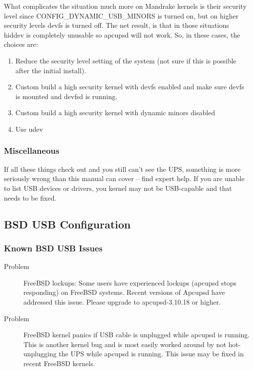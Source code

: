 What complicates the situation much more on Mandrake kernels is their security
level since CONFIG\_DYNAMIC\_USB\_MINORS is turned on, but on higher security
levels devfs is turned off. The net result, is that in those situations hiddev
is completely unusable so apcupsd will not work. So, in these cases,
the choices are: 

\begin{enumerate}
    \item Reduce the security level setting of the system (not sure if 
    this is possible after the initial install).
    \item Custom build a high security kernel with devfs enabled and make
    sure devfs is mounted and devfsd is running.
    \item Custom build a high security kernel with dynamic minors disabled
    \item Use udev
\end{enumerate}

\subsubsection*{Miscellaneous}

If all these things check out and you still can't see the UPS, something is
more seriously wrong than this manual can cover {--} find expert help.  If you
are unable to list USB devices or drivers, you kernel may not be USB-capable
and that needs to be fixed.

\subsection*{BSD USB Configuration}

\subsubsection*{Known BSD USB Issues}

\begin{description}
\item [Problem]
FreeBSD lockups: Some users have experienced lockups (apcupsd stops 
responding) on FreeBSD systems. Recent versions of Apcupsd have addressed
this issue. Please upgrade to apcupsd-3.10.18 or higher.

\item [Problem]
FreeBSD kernel panics if USB cable is unplugged while apcupsd is running. 
This is another kernel bug and is most easily worked around by not hot- 
unplugging the UPS while apcupsd is running. This issue may be fixed in
recent FreeBSD kernels.
\end{description}

